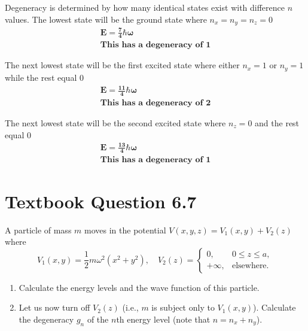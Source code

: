 \documentclass[12pt]{article}
\begin{document}
        Degeneracy is determined by how many identical states exist with difference $n$ values.
        The lowest state will be the ground state where $n_x = n_y = n_z = 0$
        \begin{align*}
            \boldsymbol{\boxed{E = \frac{7}{4} \hbar \omega}} \\
            \boldsymbol{\boxed{\text{This has a degeneracy of 1}}}
        \end{align*}
        
        The next lowest state will be the first excited state where either $n_x = 1$ or $n_y=1$ while the rest equal 0
        \begin{align*}
            \boldsymbol{\boxed{E = \frac{11}{4} \hbar \omega}} \\
            \boldsymbol{\boxed{\text{This has a degeneracy of 2}}}
        \end{align*}
            
        The next lowest state will be the second excited state where $n_z=0$ and the rest equal 0
        \begin{align*}
            \boldsymbol{\boxed{E = \frac{13}{4} \hbar \omega}} \\
            \boldsymbol{\boxed{\text{This has a degeneracy of 1}}}
        \end{align*}

\section{Textbook Question 6.7}
    A particle of mass \( m \) moves in the potential \( V(x, y, z) = V_1(x, y) + V_2(z) \) where
    \[
        V_1(x, y) = \frac{1}{2} m \omega^2 \left( x^2 + y^2 \right), \quad
        V_2(z) = 
        \begin{cases}
        0, & 0 \leq z \leq a, \\
        +\infty, & \text{elsewhere}.
        \end{cases}
    \]

    \begin{enumerate}
        \item[(a)] Calculate the energy levels and the wave function of this particle.
        \item[(b)] Let us now turn off \( V_2(z) \) (i.e., \( m \) is subject only to \( V_1(x, y) \)). Calculate the degeneracy \( g_n \) of the \( n \)th energy level (note that \( n = n_x + n_y \)).
    \end{enumerate}
\end{document}
